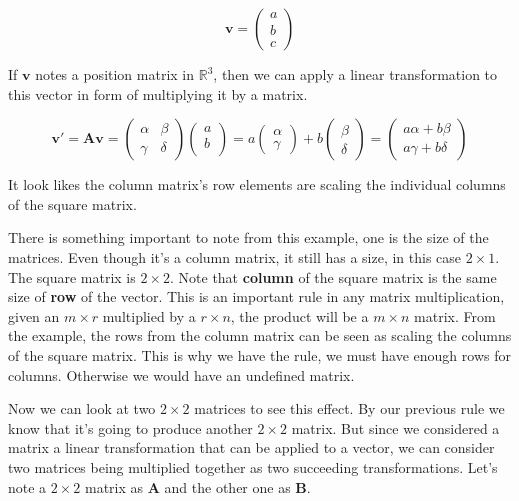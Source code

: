 \begin{equation*}
	\mathbf{v} = \begin{pmatrix}
		a \\ 
		b \\ 
		c 
	\end{pmatrix} 
\end{equation*}

If $\mathbf{v}$ notes a position matrix in $\mathbb{R}^3$, then we can apply a linear transformation to this vector in form of multiplying it by a matrix.

\begin{equation*}
	\mathbf{v'} = 	\mathbf{A}\mathbf{v} = \begin{pmatrix}
		\alpha & \beta \\
		\gamma & \delta
	\end{pmatrix}\begin{pmatrix}
		a \\ 
		b \\ 
	\end{pmatrix} = a \begin{pmatrix}
		\alpha \\ 
		\gamma
	\end{pmatrix} +  b\begin{pmatrix}
		\beta \\ 
		\delta
	\end{pmatrix} = 
	\begin{pmatrix}
		a\alpha + b\beta \\ 
		a\gamma + b\delta 
	\end{pmatrix}
\end{equation*}


It look likes the column matrix's row elements are scaling the individual columns of the square matrix.

There is something important to note from this example, one is the size of the matrices. Even though it's a column matrix, it still has a size, in this case $2\times1$. The square matrix is $2\times2$. Note that \textbf{column} of the square matrix is the same size of \textbf{row} of the vector. This is an important rule in any matrix multiplication, given an $m\times r$ multiplied by a $r\times n$, the product will be a $m \times n$ matrix. From the example, the rows from the column matrix can be seen as scaling the columns of the square matrix. This is why we have the rule, we must have enough rows for columns. Otherwise we would have an undefined matrix. 

Now we can look at two $2\times2$ matrices to see this effect. By our previous rule we know that it's going to produce another $2\times2$ matrix. But since we considered a matrix a linear transformation that can be applied to a vector, we can consider two matrices being multiplied together as two succeeding transformations. Let's note a $2\times2$ matrix as $\mathbf{A}$ and the other one as $\mathbf{B}$. 

